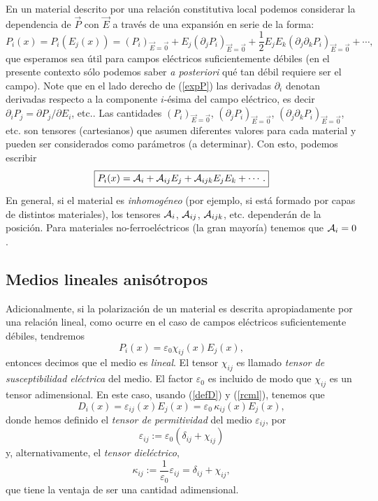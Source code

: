 En un material descrito por una relación constitutiva local podemos considerar
la dependencia de $\vec{P}$ con $\vec{E}$ a través de una expansión en serie
de la forma:
\begin{equation}\label{expP}
P_i(x)=P_i(E_j(x))=(P_i)_{\vec{E}=\vec{0}}
+E_j(\partial_jP_i)_{\vec{E}=\vec{0}}+\frac{1}{2}
E_jE_k(\partial_j\partial_k P_i)_{\vec{E}=\vec{0}}+\cdots,
\end{equation}
que esperamos sea útil para campos eléctricos suficientemente débiles (en el
presente contexto sólo podemos saber \textit{a posteriori} qué tan débil
requiere ser el campo). Note que en el lado derecho de (\ref{expP}) las derivadas $\partial_i$ denotan derivadas respecto a la componente $i$-ésima del campo eléctrico, es decir $\partial_iP_j={\partial P_j}/{\partial E_i}$, etc.. Las cantidades $(P_i)_{\vec{E}=\vec{0}}$,
$(\partial_jP_i)_{\vec{E}=\vec{0}}$,
$(\partial_j\partial_k P_i)_{\vec{E}=\vec{0}}$, etc. son
tensores (cartesianos) que asumen diferentes valores para cada material y pueden ser
considerados como parámetros (a determinar). Con esto, podemos escribir
\begin{equation}
\boxed{P_i(x)={\cal A}_i+{\cal A}_{ij}E_j+{\cal A}_{ijk}
E_jE_k+\cdots.}
\end{equation}
En general, si el material es \textit{inhomogéneo} (por ejemplo, si está formado por
capas de distintos materiales), los tensores ${\cal A}_i$, ${\cal A}_{ij}$, ${\cal A}_{ijk}$, etc. dependerán de la posición. Para materiales no-ferroeléctricos (la gran mayoría) tenemos que ${\cal A}_i=0$.



\subsection{Medios lineales anisótropos}\label{sec:aniso}

Adicionalmente, si la polarización de un material es descrita apropiadamente
por una relación lineal, como ocurre en el caso de campos eléctricos
suficientemente débiles, tendremos
\begin{equation}
\boxed{P_i(x)=\varepsilon_0\chi_{ij}(x)E_j(x),} \label{rcml}
\end{equation}
entonces decimos que el medio es \textit{lineal}. El tensor $\chi_{ij}$ es
llamado \textit{tensor de susceptibilidad eléctrica} del medio.  El factor $\varepsilon_0$ es incluido de modo que $\chi_{ij}$ es un tensor adimensional. En este caso,
usando (\ref{defD}) y (\ref{rcml}), tenemos que
\begin{equation}\label{rclai}
\boxed{D_i(x)=\varepsilon_{ij}(x)E_j(x)=\varepsilon_0\,\kappa_{ij}(x)E_j(x),}
\end{equation}
donde hemos definido el \textit{tensor de permitividad} del medio
$\varepsilon_{ij}$, por
\begin{equation}
\varepsilon_{ij}:=\varepsilon_0(\delta_{ij}+\chi_{ij})
\end{equation}
y, alternativamente,  el \textit{tensor dieléctrico},
\begin{equation}
\kappa_{ij}:=\frac{1}{\varepsilon_0}\varepsilon_{ij}=\delta_{ij}+\chi_{ij},
\end{equation}
que tiene la ventaja de ser una cantidad adimensional.

